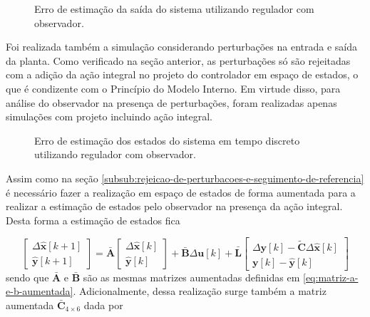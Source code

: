\begin{figure}[!ht]
    \caption{Erro de estimação da saída do sistema utilizando regulador com
    observador.}
    \vspace{-10pt}
    \hspace{-30pt}
    \label{fig:erro-de-das-saidas-estimadas-utilizando-observador}
    \begin{minipage}{\linewidth}
        
    \end{minipage}
\end{figure}

Foi realizada também a simulação considerando perturbações na entrada e saída da
planta. Como verificado na seção anterior, as perturbações só são rejeitadas com
a adição da ação integral no projeto do controlador em espaço de estados, o que
é condizente com o Princípio do Modelo Interno. Em virtude disso, para análise
do observador na presença de perturbações, foram realizadas apenas simulações
com projeto incluindo ação integral.

\begin{figure}[!ht]
    \caption{Erro de estimação dos estados do sistema em tempo discreto
    utilizando regulador com observador.}
    \vspace{-10pt}
    \hspace{-30pt}
    \label{fig:erro-de-estimacao-de-estados-com-observador}
    \begin{minipage}{\linewidth}
        
    \end{minipage}
\end{figure}

Assim como na seção
\ref{subsub:rejeicao-de-perturbacoes-e-seguimento-de-referencia} é necessário
fazer a realização em espaço de estados de forma aumentada para a realizar a
estimação de estados pelo observador na presença da ação integral. Desta forma a
estimação de estados fica

\begin{equation}
    \label{eq:estimacao-de-estados-com-observador-e-acao-integral}
    \begin{bmatrix}
        \Delta \mathbf{\hat{x}}[k+1] \\
        \mathbf{\hat{y}}[k+1]
    \end{bmatrix}
    =
    \mathbf{\bar{A}}
    \begin{bmatrix}
        \Delta \mathbf{\hat{x}}[k] \\
        \mathbf{\hat{y}}[k]
    \end{bmatrix}
    +
    \mathbf{\bar{B}}
    \Delta \mathbf{u}[k]
    +
    \mathbf{\bar{L}}
    \begin{bmatrix}
        \Delta \mathbf{y}[k] - \mathbf{\tilde{C}} \Delta \mathbf{\hat{x}}[k] \\
        \mathbf{y}[k] - \mathbf{\hat{y}}[k]
    \end{bmatrix}
\end{equation} sendo que $\mathbf{\bar{A}}$ e $\mathbf{\bar{B}}$ são as mesmas
matrizes aumentadas definidas em \ref{eq:matriz-a-e-b-aumentada}.
Adicionalmente, dessa realização surge também a matriz aumentada
$\mathbf{\bar{C}}_{4 \times 6}$ dada por

